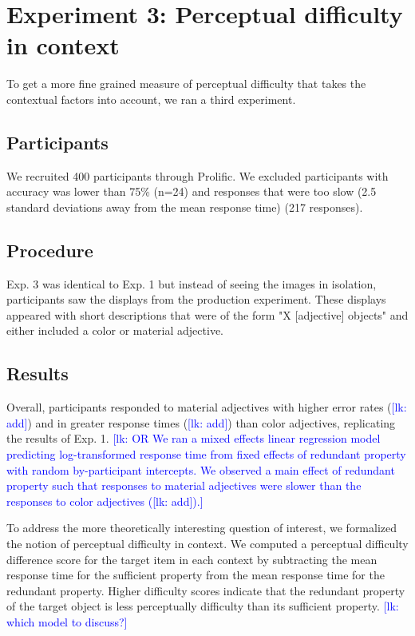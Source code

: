 \documentclass[12pt,letterpaper]{article}
\newcommand{\lk}[1]{\textcolor{Blue}{[lk: #1]}}
\begin{document}
\section{Experiment 3: Perceptual difficulty in context} 

To get a more fine grained measure of perceptual difficulty that takes the contextual factors into account, we ran a third experiment. 

\subsection{Participants} 

We recruited 400 participants through Prolific. We excluded participants with accuracy was lower than 75\% (n=24) and responses that were too slow (2.5 standard deviations away from the mean response time) (217 responses).

\subsection{Procedure} 

Exp. 3 was identical to Exp. 1 but instead of seeing the images in isolation, participants saw the displays from the production experiment. These displays appeared with short descriptions that were of the form "X [adjective] objects" and either included a color or material adjective.

\subsection{Results} 

Overall, participants responded to material adjectives with higher error rates (\lk{add}) and in greater response times (\lk{add}) than color adjectives, replicating the results of Exp. 1. \lk{OR We ran a mixed effects linear regression model predicting log-transformed response time from fixed effects of redundant property with random by-participant intercepts. We observed a main effect of redundant property such that responses to material adjectives were slower than the responses to color adjectives (\lk{add}).}

To address the more theoretically interesting question of interest, we formalized the notion of perceptual difficulty in context. We computed a perceptual difficulty difference score for the target item in each context by subtracting the mean response time for the sufficient property from the mean response time for the redundant property. Higher difficulty scores indicate that the redundant property of the target object is less perceptually difficulty than its sufficient property. \lk{which model to discuss?}
 
\end{document}

